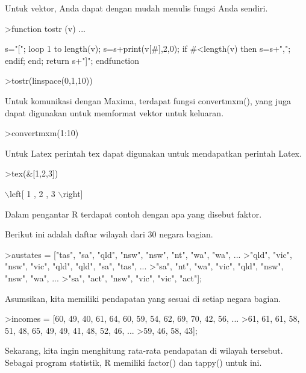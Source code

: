 \documentclass[a4paper,10pt]{article}
\begin{document}
\begin{eulernotebook}
\begin{eulercomment}
Untuk vektor, Anda dapat dengan mudah menulis fungsi Anda sendiri.
\end{eulercomment}
\begin{eulerprompt}
>function tostr (v) ...
\end{eulerprompt}
\begin{eulerudf}
  s="[";
  loop 1 to length(v);
     s=s+print(v[#],2,0);
     if #<length(v) then s=s+","; endif;
  end;
  return s+"]";
  endfunction
\end{eulerudf}
\begin{eulerprompt}
>tostr(linspace(0,1,10))
\end{eulerprompt}
\begin{euleroutput}
  [0.00,0.10,0.20,0.30,0.40,0.50,0.60,0.70,0.80,0.90,1.00]
\end{euleroutput}
\begin{eulercomment}
Untuk komunikasi dengan Maxima, terdapat fungsi convertmxm(), yang
juga dapat digunakan untuk memformat vektor untuk keluaran.
\end{eulercomment}
\begin{eulerprompt}
>convertmxm(1:10)
\end{eulerprompt}
\begin{euleroutput}
  [1,2,3,4,5,6,7,8,9,10]
\end{euleroutput}
\begin{eulercomment}
Untuk Latex perintah tex dapat digunakan untuk mendapatkan perintah
Latex.
\end{eulercomment}
\begin{eulerprompt}
>tex(&[1,2,3])
\end{eulerprompt}
\begin{euleroutput}
  \(\backslash\)left[ 1 , 2 , 3 \(\backslash\)right] 
\end{euleroutput}
\begin{eulercomment}
Dalam pengantar R terdapat contoh dengan apa yang disebut faktor.

Berikut ini adalah daftar wilayah dari 30 negara bagian.
\end{eulercomment}
\begin{eulerprompt}
>austates = ["tas", "sa", "qld", "nsw", "nsw", "nt", "wa", "wa", ...
>"qld", "vic", "nsw", "vic", "qld", "qld", "sa", "tas", ...
>"sa", "nt", "wa", "vic", "qld", "nsw", "nsw", "wa", ...
>"sa", "act", "nsw", "vic", "vic", "act"];
\end{eulerprompt}
\begin{eulercomment}
Asumsikan, kita memiliki pendapatan yang sesuai di setiap negara
bagian.
\end{eulercomment}
\begin{eulerprompt}
>incomes = [60, 49, 40, 61, 64, 60, 59, 54, 62, 69, 70, 42, 56, ...
>61, 61, 61, 58, 51, 48, 65, 49, 49, 41, 48, 52, 46, ...
>59, 46, 58, 43];
\end{eulerprompt}
\begin{eulercomment}
Sekarang, kita ingin menghitung rata-rata pendapatan di wilayah
tersebut. Sebagai program statistik, R memiliki factor() dan tappy()
untuk ini.


\end{eulercomment}
\end{eulernotebook}
\end{document}
